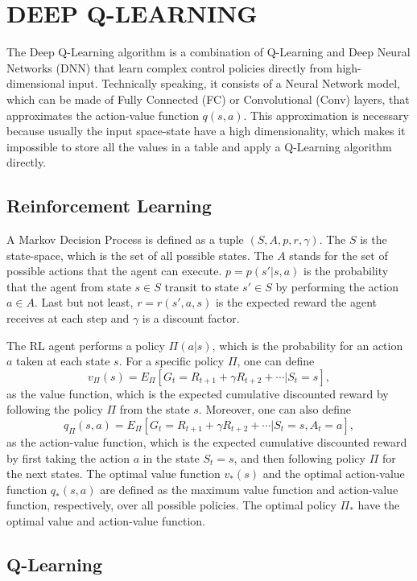\documentclass[conference]{IEEEtran}
\begin{document}
\section{DEEP Q-LEARNING}

The Deep Q-Learning algorithm is a combination of Q-Learning and Deep Neural Networks (DNN) that learn complex control policies directly from high-dimensional input. Technically speaking, it consists of a Neural Network model, which can be made of Fully Connected (FC) or Convolutional (Conv) layers, that approximates the action-value function $q(s,a)$. This approximation is necessary because usually the input space-state have a high dimensionality, which makes it impossible to store all the values in a table and apply a Q-Learning algorithm directly.

\subsection{Reinforcement Learning}

A Markov Decision Process is defined as a tuple $(S, A, p, r, \gamma)$. The $S$ is the state-space, which is the set of all possible states. The $A$ stands for the set of possible actions that the agent can execute. $p = p(s'|s, a)$ is the probability that the agent from state $s\in S$ transit to state $s' \in S$ by performing the action $a\in A$. Last but not least, $r = r(s', a, s)$ is the expected reward the agent receives at each step and $\gamma$ is a discount factor.

The RL agent performs a policy $\Pi(a|s)$, which is the probability for an action $a$ taken at each state $s$. For a specific policy $\Pi$, one can define
$$
   v_\Pi(s) = E_\Pi[G_t = R_{t+1} + \gamma R_{t+2} + \cdots | S_t = s],
$$
as the value function, which is the expected cumulative discounted reward by following the policy $\Pi$ from the state $s$. Moreover, one can also define
$$
   q_\Pi(s, a) = E_\Pi[G_t = R_{t+1} + \gamma R_{t+2} + \cdots | S_t = s, A_t = a],
$$
as the action-value function, which is the expected cumulative discounted reward by first taking the action $a$ in the state $S_t = s$, and then following policy $\Pi$ for the next states. The optimal value function $v_*(s)$ and the optimal action-value function $q_*(s, a)$ are defined as the maximum value function and action-value function, respectively, over all possible policies. The optimal policy $\Pi_*$ have the optimal value and action-value function.

\subsection{Q-Learning}
\end{document}
